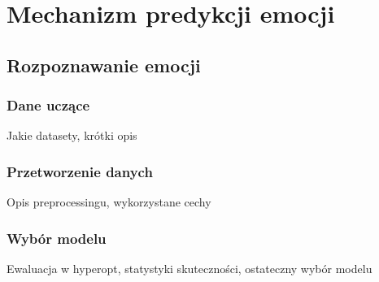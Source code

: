 \chapter{Mechanizm predykcji emocji}
\label{cha:predykcja}
\section{Rozpoznawanie emocji}
\subsection{Dane uczące}
Jakie datasety, krótki opis
\subsection{Przetworzenie danych}
Opis preprocessingu, wykorzystane cechy
\subsection{Wybór modelu}
Ewaluacja w hyperopt, statystyki skuteczności, ostateczny wybór modelu